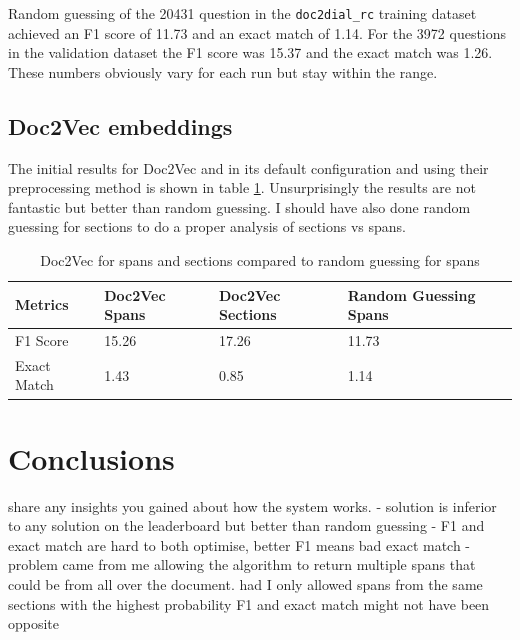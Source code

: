 \documentclass[11pt]{article}
\begin{document}
    Random guessing of the 20431 question in the \texttt{doc2dial\_rc} training dataset achieved an F1 score of 11.73
    and an exact match of 1.14. For the 3972 questions in the validation dataset the F1 score was 15.37 and the exact match
    was 1.26. These numbers obviously vary for each run but stay within the range.

    \subsection{Doc2Vec embeddings}\label{subsec:doc2vec-results}

    The initial results for Doc2Vec and in its default configuration and using their preprocessing method is shown
    in table \ref{table:simple-doc2vec-results}. Unsurprisingly the results are not fantastic but better than random
    guessing. I should have also done random guessing for sections to do a proper analysis of sections vs spans.

    \begin{table}[h!]
        \centering
        \begin{tabular}{|l|l|l|l|}
        \hline
        Metrics     & Doc2Vec Spans    & Doc2Vec Sections & Random Guessing Spans \\ \hline
        F1 Score    & 15.26             & 17.26            & 11.73                \\ \hline
        Exact Match & 1.43              & 0.85             & 1.14                 \\ \hline
        \end{tabular}
        \caption{Doc2Vec for spans and sections compared to random guessing for spans}
        \label{table:simple-doc2vec-results}
    \end{table}


    \section{Conclusions}\label{sec:conclusions}
    share any insights you gained about how the system works.
    - solution is inferior to any solution on the leaderboard but better than random guessing
    - F1 and exact match are hard to both optimise, better F1 means bad exact match
    -   problem came from me allowing the algorithm to return multiple spans that could be from all over the document.
    had I only allowed spans from the same sections with the highest probability F1 and exact match might not have been opposite
\end{document}
